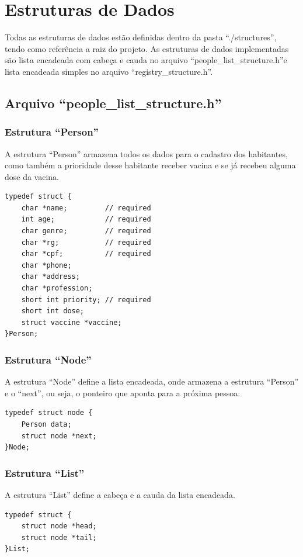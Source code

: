 \documentclass[12pt, a4paper]{article}
\newcommand{\prof}{Rômulo César Silva}
\begin{document}
\pagestyle{fancy}
\fancyfoot[L]{}
\fancyhead[L]{}
\fancyhead[R]{}

\tableofcontents
\listoffigures
\newpage

\section{Estruturas de Dados}\label{Estruturas de Dados}
Todas as estruturas de dados estão definidas dentro da pasta ``./structures'', tendo como referência a raiz do projeto. As estruturas de dados implementadas são lista encadeada com cabeça e cauda no arquivo ``people\_list\_structure.h''e lista encadeada simples no arquivo ``registry\_structure.h''.
\subsection{Arquivo ``people\_list\_structure.h''}\label{Arquivo``peoplelist.h''}
\subsubsection{Estrutura ``Person''}\label{Estrutura ``Person''}
A estrutura ``Person'' armazena todos os dados para o cadastro dos habitantes, como também a prioridade desse habitante receber vacina e se já recebeu alguma dose da vacina.
\begin{lstlisting}
typedef struct {
    char *name;         // required
    int age;            // required
    char genre;         // required
    char *rg;           // required
    char *cpf;          // required
    char *phone;
    char *address;
    char *profession;
    short int priority; // required
    short int dose;
    struct vaccine *vaccine;
}Person;
\end{lstlisting}
\subsubsection{Estrutura ``Node''}\label{Estrutura ``Node''}
A estrutura ``Node'' define a lista encadeada, onde armazena a estrutura ``Person'' e o ``next'', ou seja, o ponteiro que aponta para a próxima pessoa.
\begin{lstlisting}
typedef struct node {
    Person data;
    struct node *next;
}Node;
\end{lstlisting}
\cleardoublepage
\subsubsection{Estrutura ``List''}\label{Estrutura ``List''}
A estrutura ``List'' define a cabeça e a cauda da lista encadeada.
\begin{lstlisting}
typedef struct {
    struct node *head;
    struct node *tail;
}List;
\end{lstlisting}
\end{document}
